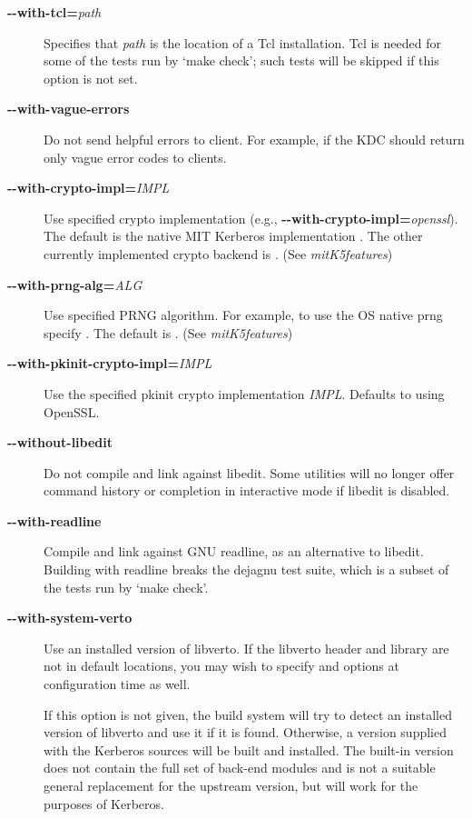 \documentclass[letterpaper,10pt,english]{sphinxmanual}
\begin{document}
\begin{description}
\item[{\textbf{-}\textbf{-with-tcl=}\emph{path}}] \leavevmode
Specifies that \emph{path} is the location of a Tcl installation.
Tcl is needed for some of the tests run by `make check'; such tests
will be skipped if this option is not set.

\item[{\textbf{-}\textbf{-with-vague-errors}}] \leavevmode
Do not send helpful errors to client.  For example, if the KDC
should return only vague error codes to clients.

\item[{\textbf{-}\textbf{-with-crypto-impl=}\emph{IMPL}}] \leavevmode
Use specified crypto implementation (e.g., \textbf{-}\textbf{-with-crypto-impl=}\emph{openssl}).  The default is the native MIT
Kerberos implementation .  The other currently
implemented crypto backend is .  (See
\emph{mitK5features})

\item[{\textbf{-}\textbf{-with-prng-alg=}\emph{ALG}}] \leavevmode
Use specified PRNG algorithm.  For example, to use the OS native
prng specify .  The default is .
(See \emph{mitK5features})

\item[{\textbf{-}\textbf{-with-pkinit-crypto-impl=}\emph{IMPL}}] \leavevmode
Use the specified pkinit crypto implementation \emph{IMPL}.
Defaults to using OpenSSL.

\item[{\textbf{-}\textbf{-without-libedit}}] \leavevmode
Do not compile and link against libedit.  Some utilities will no
longer offer command history or completion in interactive mode if
libedit is disabled.

\item[{\textbf{-}\textbf{-with-readline}}] \leavevmode
Compile and link against GNU readline, as an alternative to libedit.
Building with readline breaks the dejagnu test suite, which is a
subset of the tests run by `make check'.

\item[{\textbf{-}\textbf{-with-system-verto}}] \leavevmode
Use an installed version of libverto.  If the libverto header and
library are not in default locations, you may wish to specify
 and  options
at configuration time as well.

If this option is not given, the build system will try to detect
an installed version of libverto and use it if it is found.
Otherwise, a version supplied with the Kerberos sources will be
built and installed.  The built-in version does not contain the
full set of back-end modules and is not a suitable general
replacement for the upstream version, but will work for the
purposes of Kerberos.


\end{description}
\end{document}
